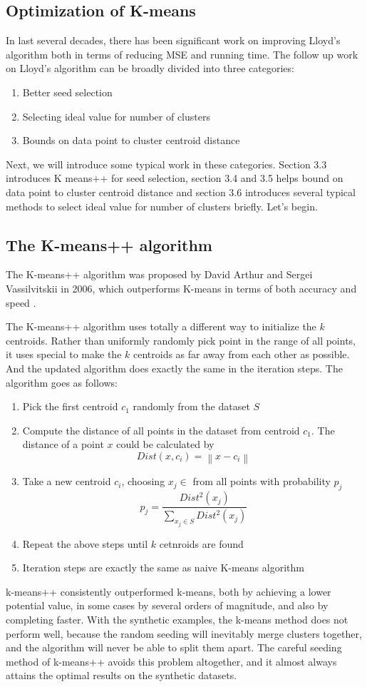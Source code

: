 \documentclass[11pt]{article}
\begin{document}
\subsection{Optimization of K-means}
In last several decades, there has been significant work on improving Lloyd’s algorithm both in terms of reducing MSE and running time. The follow up
work on Lloyd’s algorithm can be broadly divided into three categories:
\begin{enumerate}
\item Better seed selection
\item Selecting ideal value for number of clusters
\item Bounds on data point to cluster centroid distance
\end{enumerate}
Next, we will introduce some typical work in these categories. Section 3.3 introduces K means++ for seed selection, section 3.4 and 3.5 helps bound on data point to cluster centroid distance and section 3.6 introduces several typical methods to select ideal value for number of clusters briefly. Let's begin.


\subsection{The K-means++ algorithm}
The K-means++ algorithm was proposed by David Arthur and Sergei Vassilvitskii in 2006, which outperforms K-means in terms of both accuracy and speed \cite{kmeanspp}.
\par The K-means++ algorithm uses totally a different way to initialize the $k$ centroids. Rather than uniformly randomly pick point in the range of all points, it uses special to make the $k$ centroids as far away from each other as possible.
And the updated algorithm does exactly the same in the iteration steps. The algorithm goes as follows:
\begin{enumerate}
  \item Pick the first centroid $c_1$ randomly from the dataset $S$
  \item Compute the distance of all points in the dataset from centroid $c_1$. The distance of a point $x$ could be calculated by $$ Dist(x, c_i) = {\left\lVert x-c_i\right\rVert } $$
  \item Take a new centroid $c_i$, choosing $x_j \in $ from all points with probability $p_j$ $$p_j = \frac{Dist^2(x_j)}{\sum_{x_j \in S} Dist^2(x_j)} $$
  \item Repeat the above steps until $k$ cetnroids are found
  \item Iteration steps are exactly the same as naive K-means algorithm
\end{enumerate}
\par k-means++ consistently outperformed k-means, both by achieving a lower potential value,
in some cases by several orders of magnitude, and also by completing faster. With the synthetic
examples, the k-means method does not perform well, because the random seeding will inevitably
merge clusters together, and the algorithm will never be able to split them apart. The careful
seeding method of k-means++ avoids this problem altogether, and it almost always attains the
optimal results on the synthetic datasets.\cite{kmeanspp}
\end{document}
